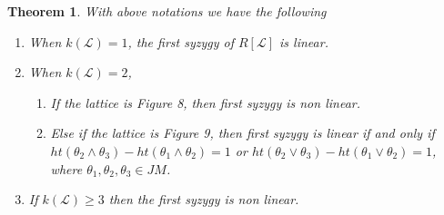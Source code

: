 \documentclass[10pt,reqno]{amsart}
\numberwithin{equation}{section}
\newtheorem{theorem}{Theorem}[section]
\begin{document}
\begin{theorem}
 \label{last} With above notations we have the following
\begin{enumerate}
 \item When $k(\mathcal{L})=1$, the first syzygy of $R[\mathcal{L}]$ is linear.
 \item When $k(\mathcal{L})=2$,
 \begin{enumerate}
  \item If the lattice is Figure 8, then first syzygy is non linear.
  \item  Else if the lattice is Figure 9, then first syzygy is linear if and only if $ht(\theta_2 \wedge \theta_3)
 -ht(\theta_1 \wedge \theta_2)=1$ or $ht(\theta_2 \vee \theta_3)-ht(\theta_1 \vee \theta_2)=1$, where $\theta_1,\theta_2,
 \theta_3 \in JM$.
 \end{enumerate}
 \item If $k(\mathcal{L}) \geq 3$ then the first syzygy is non linear.
\end{enumerate} 
\end{theorem}
\end{document}
